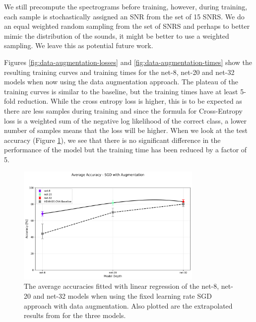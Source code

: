 \documentclass[logo,bsc,singlespacing,parskip,online]{infthesis}
\begin{document}
We still precompute the spectrograms before training, however, during 
training, each sample is stochastically assigned an SNR from the set of 
15 SNRS. We do an equal weighted random sampling from the set of SNRS 
and perhaps to better mimic the distribution of the sounds, it might 
be better to use a weighted sampling. We leave this as 
potential future work.

Figures \ref{fig:data-augmentation-losses} and \ref{fig:data-augmentation-times} show 
the resulting training curves and training times for the net-8, net-20 and net-32 models
when now using the data augmentation approach. The plateau of the training curves 
is similar to the baseline, but the training times have at least 
5-fold reduction. While the cross entropy loss is higher, this is 
to be expected as there are less samples during training and since the formula for 
Cross-Entropy loss is a weighted sum of the negative log likelihood of 
the correct class, a lower number of samples means that the loss 
will be higher. When we look at the test accuracy (Figure \ref{fig:data-augmentation-accuracies}),
we see that there is no significant difference in the performance of the model 
but the training time has been reduced by a factor of 5.

\begin{figure}[h]
   \centering
   \includegraphics[width=0.8\textwidth]{average_accuracies_sgd_aug.png}
   \caption{The average accuracies fitted with linear regression of the net-8, net-20 and net-32 models when using the fixed learning rate SGD approach with data augmentation.
   Also plotted are the extrapolated results from \citet{Huwel2020HearDS} for the three models.
   }
   \label{fig:data-augmentation-accuracies}
\end{figure}
\end{document}
